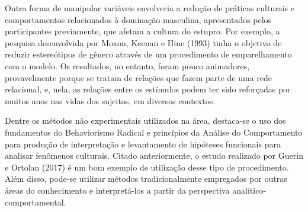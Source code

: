 Outra forma de manipular variáveis envolveria a redução de práticas culturais e comportamentos relacionados à dominação masculina, apresentados pelos participantes previamente, que afetam a cultura do estupro. Por exemplo, a pesquisa desenvolvida por Moxon, Keenan e Hine (1993) tinha o objetivo de reduzir estereótipos de gênero através de um procedimento de emparelhamento com o modelo. Os resultados, no entanto, foram pouco animadores, provavelmente porque se tratam de relações que fazem parte de uma rede relacional, e, nela, as relações entre os estímulos podem ter sido reforçadas por muitos anos nas vidas dos sujeitos, em diversos contextos.

Dentre os métodos não experimentais utilizados na área, destaca-se o uso dos fundamentos do Behaviorismo Radical e princípios da Análise do Comportamento para produção de interpretação e levantamento de hipóteses funcionais para analisar fenômenos culturais. Citado anteriormente, o estudo realizado por Guerin e Ortolan (2017) é um bom exemplo de utilização desse tipo de procedimento. Além disso, pode-se utilizar métodos tradicionalmente empregados por outras áreas do conhecimento e interpretá-los a partir da perspectiva analítico-comportamental.


